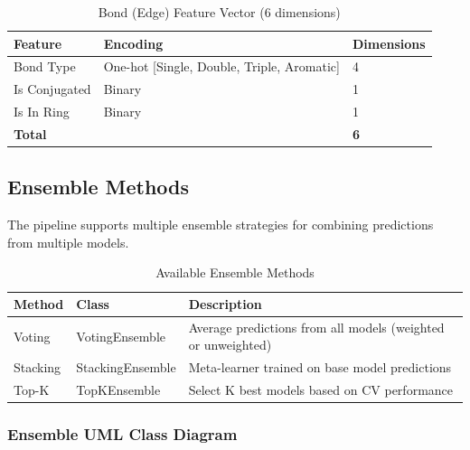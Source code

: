 \documentclass[11pt,a4paper]{article}
\begin{document}
\begin{table}[H]
\centering
\caption{Bond (Edge) Feature Vector (6 dimensions)}
\begin{tabular}{@{}lll@{}}
\toprule
\textbf{Feature} & \textbf{Encoding} & \textbf{Dimensions} \\
\midrule
Bond Type & One-hot [Single, Double, Triple, Aromatic] & 4 \\
Is Conjugated & Binary & 1 \\
Is In Ring & Binary & 1 \\
\midrule
\textbf{Total} & & \textbf{6} \\
\bottomrule
\end{tabular}
\end{table}

\subsection{Ensemble Methods}

The pipeline supports multiple ensemble strategies for combining predictions from multiple models.

\begin{table}[H]
\centering
\caption{Available Ensemble Methods}
\begin{tabular}{@{}llp{6.5cm}@{}}
\toprule
\textbf{Method} & \textbf{Class} & \textbf{Description} \\
\midrule
Voting & VotingEnsemble & Average predictions from all models (weighted or unweighted) \\
Stacking & StackingEnsemble & Meta-learner trained on base model predictions \\
Top-K & TopKEnsemble & Select K best models based on CV performance \\
\bottomrule
\end{tabular}
\end{table}

\subsubsection{Ensemble UML Class Diagram}
\end{document}
